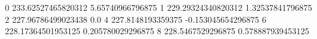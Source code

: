 0 233.62527465820312 5.65740966796875
1 229.29324340820312 1.32537841796875
2 227.96786499023438 0.0
4 227.8148193359375 -0.153045654296875
6 228.17364501953125 0.205780029296875
8 228.5467529296875 0.578887939453125
